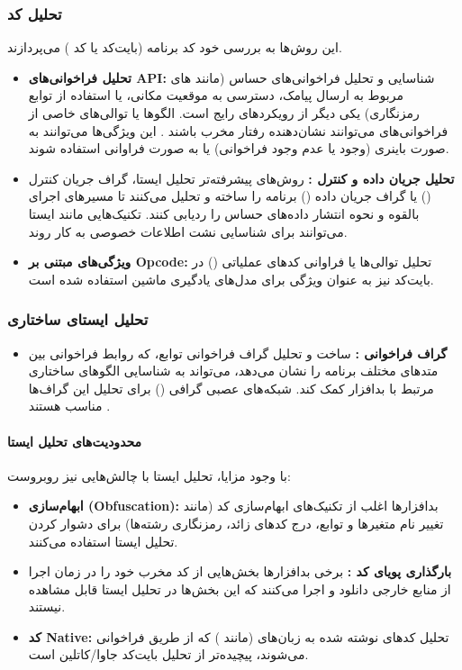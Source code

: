 \subsubsection{تحلیل کد }
این روش‌ها به بررسی خود کد برنامه (بایت‌کد  یا کد ) می‌پردازند.
\begin{itemize}
    \item \textbf{تحلیل فراخوانی‌های API:} شناسایی و تحلیل فراخوانی‌های  حساس (مانند های مربوط به ارسال پیامک، دسترسی به موقعیت مکانی، یا استفاده از توابع رمزنگاری) یکی دیگر از رویکردهای رایج است. الگوها یا توالی‌های خاصی از فراخوانی‌های  می‌توانند نشان‌دهنده رفتار مخرب باشند \cite{Yuan2014}. این ویژگی‌ها می‌توانند به صورت باینری (وجود یا عدم وجود فراخوانی) یا به صورت فراوانی استفاده شوند.
    \item \textbf{تحلیل جریان داده و کنترل :} روش‌های پیشرفته‌تر تحلیل ایستا، گراف جریان کنترل () یا گراف جریان داده () برنامه را ساخته و تحلیل می‌کنند تا مسیرهای اجرای بالقوه و نحوه انتشار داده‌های حساس را ردیابی کنند. تکنیک‌هایی مانند  ایستا می‌توانند برای شناسایی نشت اطلاعات خصوصی به کار روند.
    \item \textbf{ویژگی‌های مبتنی بر Opcode:} تحلیل توالی‌ها یا فراوانی کدهای عملیاتی () در بایت‌کد نیز به عنوان ویژگی برای مدل‌های یادگیری ماشین استفاده شده است.
\end{itemize}

\subsubsection{تحلیل ایستای ساختاری}
\begin{itemize}
    \item \textbf{گراف فراخوانی :} ساخت و تحلیل گراف فراخوانی توابع، که روابط فراخوانی بین متدهای مختلف برنامه را نشان می‌دهد، می‌تواند به شناسایی الگوهای ساختاری مرتبط با بدافزار کمک کند. شبکه‌های عصبی گرافی () برای تحلیل این گراف‌ها مناسب هستند \cite{Zhu2018}.
\end{itemize}

\paragraph{محدودیت‌های تحلیل ایستا}
با وجود مزایا، تحلیل ایستا با چالش‌هایی نیز روبروست:
\begin{itemize}
    \item \textbf{ابهام‌سازی (Obfuscation):} بدافزارها اغلب از تکنیک‌های ابهام‌سازی کد (مانند تغییر نام متغیرها و توابع، درج کدهای زائد، رمزنگاری رشته‌ها) برای دشوار کردن تحلیل ایستا استفاده می‌کنند.
    \item \textbf{بارگذاری پویای کد :} برخی بدافزارها بخش‌هایی از کد مخرب خود را در زمان اجرا از منابع خارجی دانلود و اجرا می‌کنند که این بخش‌ها در تحلیل ایستا قابل مشاهده نیستند.
    \item \textbf{کد Native:} تحلیل کدهای نوشته شده به زبان‌های  (مانند ) که از طریق  فراخوانی می‌شوند، پیچیده‌تر از تحلیل بایت‌کد جاوا/کاتلین است.
\end{itemize}

